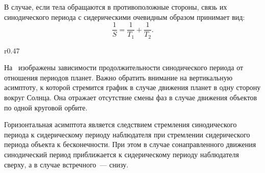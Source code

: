 В случае, если тела обращаются в противоположные стороны, связь
их синодического периода с сидерическими очевидным образом принимает вид:
\begin{equation}
	\frac{1}{S} = \frac{1}{T_1} + \frac{1}{T_2}.
\end{equation}

\begin{wrapfigure}[14]{r}{0.47\tw}
    \centering
    \vspace{-1pc}
	\caption{}
	\label{pic:sinodic-period-plot}    
\end{wrapfigure} 
На~ изображены зависимости продолжительности синодического периода от отношения периодов планет. Важно обратить внимание на вертикальную асимптоту, к которой стремится график в случае движения планет в одну сторону вокруг Солнца. Она отражает отсутствие смены фаз в случае движения объектов по одной круговой орбите.

Горизонтальная асимптота является следствием стремления синодического периода к сидерическому периоду наблюдателя при стремлении сидерического периода объекта к бесконечности. При этом в случае сонаправленного движения синодический период приближается к сидерическому периоду наблюдателя сверху, а в случае встречного~--- снизу.

{\footnotesize }

